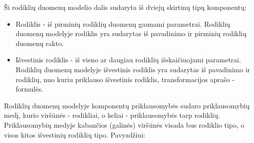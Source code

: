 \documentclass{VUMIFPSbakalaurinis}
\begin{document}
Ši rodiklių duomenų modelio dalis sudaryta iš dviejų skirtinų tipų komponentų:
\begin{itemize}
    \item Rodiklis - iš pirminių rodiklių duomenų gaunami parametrai. Rodiklių duomenų modelyje rodiklis yra sudarytas iš pavadinimo ir pirminių rodiklių duomenų rakto.
    \item Išvestinis rodiklis - iš vieno ar daugiau rodiklių išskaičiuojami parametrai. Rodiklių duomenų modelyje išvestinis rodiklis yra sudarytas iš pavadinimo ir rodiklių, nuo kuriu priklauso išvestinis rodiklis, transformacijos aprašo - formulės. 
\end{itemize}
Rodiklių duomenų modelyje komponentų priklausomybės sudaro priklausomybių medį, kurio viršūnės - rodikliai, o keliai - priklausomybės tarp rodiklių. Priklausomybių medyje kabančios (galinės) viršūnės visada bus rodiklio tipo, o visos kitos išvestinių rodiklių tipo.
Pavyzdžiui:
\end{document}
